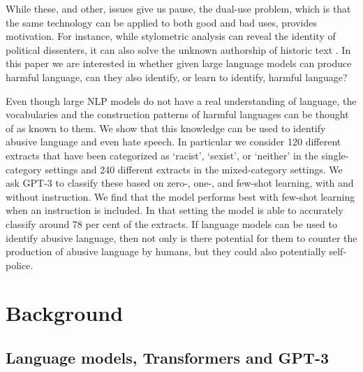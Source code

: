 \documentclass[12pt,]{article}
\begin{document}
While these, and other, issues give us pause, the dual-use problem, which is that the same technology can be applied to both good and bad uses, provides motivation. For instance, while stylometric analysis can reveal the identity of political dissenters, it can also solve the unknown authorship of historic text \citep{hovy2016social}. In this paper we are interested in whether given large language models can produce harmful language, can they also identify, or learn to identify, harmful language?

Even though large NLP models do not have a real understanding of language, the vocabularies and the construction patterns of harmful languages can be thought of as known to them. We show that this knowledge can be used to identify abusive language and even hate speech. In particular we consider 120 different extracts that have been categorized as `racist', `sexist', or `neither' in the single-category settings and 240 different extracts in the mixed-category settings. We ask GPT-3 to classify these based on zero-, one-, and few-shot learning, with and without instruction. We find that the model performs best with few-shot learning when an instruction is included. In that setting the model is able to accurately classify around 78 per cent of the extracts. If language models can be used to identify abusive language, then not only is there potential for them to counter the production of abusive language by humans, but they could also potentially self-police.

\hypertarget{background}{%
\section{Background}\label{background}}

\hypertarget{language-models-transformers-and-gpt-3}{%
\subsection{Language models, Transformers and GPT-3}\label{language-models-transformers-and-gpt-3}}
\end{document}
